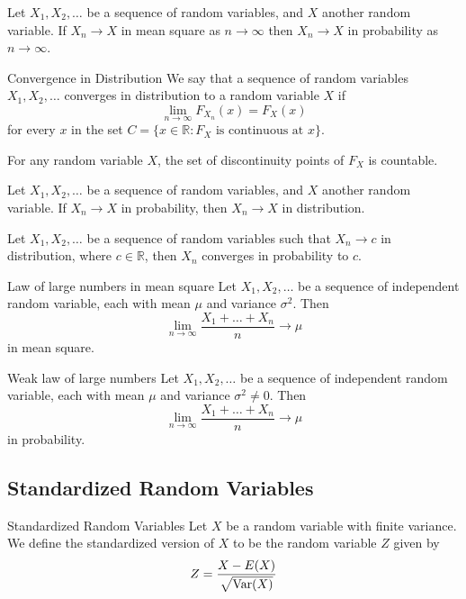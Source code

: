 \documentclass[a4paper]{article}
\begin{document}
\begin{thm}{}{} Let $X_1,X_2,\dots$ be a sequence of random variables, and $X$ another random variable. If $X_n\to X$ in mean square as $n\to\infty$ then $X_n\to X$ in probability as $n\to\infty$. 
\end{thm}

\begin{defn}{Convergence in Distribution}{} We say that a sequence of random variables $X_1,X_2,\dots$ converges in distribution to a random variable $X$ if $$\lim_{n\to\infty}F_{X_n}(x)=F_X(x)$$ for every $x$ in the set $C=\{x\in\mathbb{R}:F_X\text{ is continuous at } x\}$. 
\end{defn}

\begin{thm}{}{} For any random variable $X$, the set of discontinuity points of $F_X$ is countable. 
\end{thm}

\begin{thm}{}{} Let $X_1,X_2,\dots$ be a sequence of random variables, and $X$ another random variable. If $X_n\to X$ in probability, then $X_n\to X$ in distribution. 
\end{thm}

\begin{thm}{}{} Let $X_1,X_2,\dots$ be a sequence of random variables such that $X_n\to c$ in distribution, where $c\in\mathbb{R}$, then $X_n$ converges in probability to $c$. 
\end{thm}

\begin{thm}{Law of large numbers in mean square}{} Let $X_1,X_2,\dots$ be a sequence of independent random variable, each with mean $\mu$ and variance $\sigma^2$. Then $$\lim_{n\to\infty}\frac{X_1+\dots+X_n}{n}\to\mu$$ in mean square. 
\end{thm}

\begin{thm}{Weak law of large numbers}{} Let $X_1,X_2,\dots$ be a sequence of independent random variable, each with mean $\mu$ and variance $\sigma^2\neq 0$. Then $$\lim_{n\to\infty}\frac{X_1+\dots+X_n}{n}\to\mu$$ in probability. 
\end{thm}

\subsection{Standardized Random Variables}
\begin{defn}{Standardized Random Variables}{} Let $X$ be a random variable with finite variance. We define the standardized version of $X$ to be the random variable $Z$ given by $$Z=\frac{X-E(X)}{\sqrt{\operatorname{Var}(X)}}$$
\end{defn}
\end{document}
